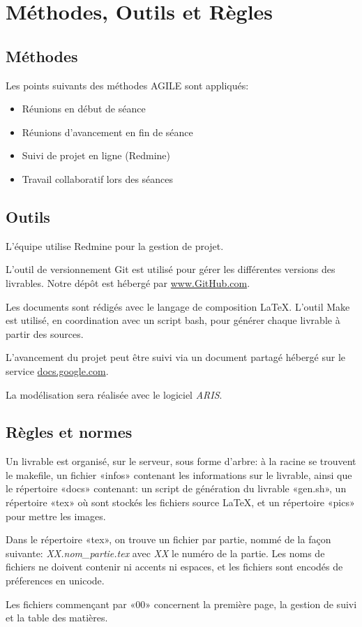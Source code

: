 \section{Méthodes, Outils et Règles}

\subsection{Méthodes}
Les points suivants des méthodes AGILE sont appliqués:
\begin{itemize}
\item Réunions en début de séance
\item Réunions d'avancement en fin de séance
\item Suivi de projet en ligne (Redmine)
\item Travail collaboratif lors des séances
\end{itemize}

\subsection{Outils}
L'équipe utilise Redmine pour la gestion de projet.
\label{outils}

L'outil de versionnement Git est utilisé pour gérer les différentes versions
des livrables. Notre dépôt est hébergé par \url{www.GitHub.com}.

Les documents sont rédigés avec le langage de composition \LaTeX.
L'outil Make est utilisé, en coordination avec un script bash, pour générer
chaque livrable à partir des sources.

L'avancement du projet peut être suivi via un document partagé hébergé
sur le service \url{docs.google.com}.

La modélisation sera réalisée avec le logiciel \textsl{ARIS}.

\subsection{Règles et normes}

Un livrable est organisé, sur le serveur, sous forme d'arbre: à la racine
se trouvent le makefile, un fichier «infos» contenant les informations sur le
livrable, ainsi que le répertoire «docs» contenant: un script de génération
du livrable «gen.sh», un répertoire «tex» où sont stockés les fichiers source \LaTeX,
et un répertoire «pics» pour mettre les images.

Dans le répertoire «tex», on trouve un fichier par partie, nommé de la façon suivante:
\textsl{XX.nom\_partie.tex} avec \textsl{XX} le numéro de la partie.
Les noms de fichiers ne doivent contenir ni accents ni espaces, et les fichiers
sont encodés de préferences en unicode.

Les fichiers commençant par «00» concernent la première page, la gestion de suivi
et la table des matières.
